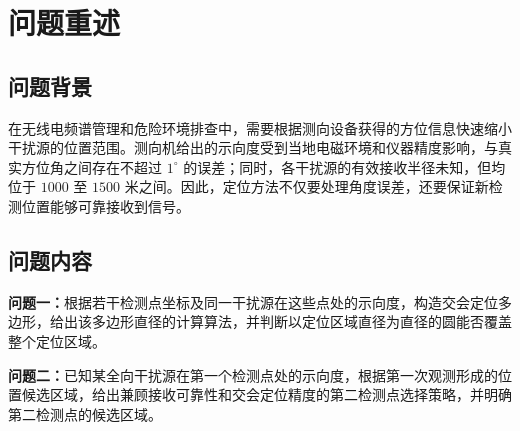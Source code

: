 \section{问题重述}

\subsection{问题背景}

在无线电频谱管理和危险环境排查中，需要根据测向设备获得的方位信息快速缩小干扰源的位置范围。测向机给出的示向度受到当地电磁环境和仪器精度影响，与真实方位角之间存在不超过 $1^\circ$ 的误差；同时，各干扰源的有效接收半径未知，但均位于 $1000$ 至 $1500$ 米之间。因此，定位方法不仅要处理角度误差，还要保证新检测位置能够可靠接收到信号。

\subsection{问题内容}

\textbf{问题一：}根据若干检测点坐标及同一干扰源在这些点处的示向度，构造交会定位多边形，给出该多边形直径的计算算法，并判断以定位区域直径为直径的圆能否覆盖整个定位区域。

\textbf{问题二：}已知某全向干扰源在第一个检测点处的示向度，根据第一次观测形成的位置候选区域，给出兼顾接收可靠性和交会定位精度的第二检测点选择策略，并明确第二检测点的候选区域。

